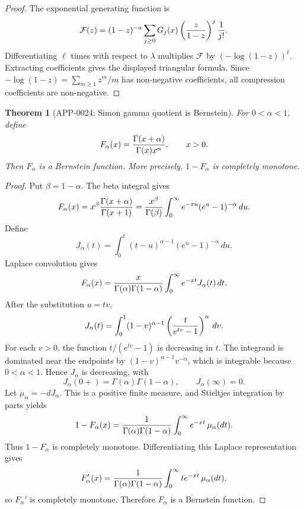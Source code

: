 \documentclass[11pt]{article}
\numberwithin{equation}{section}
\newtheorem{theorem}{Theorem}[section]
\theoremstyle{definition}
\theoremstyle{remark}
\newcommand{\1}{\mathbf 1}
\begin{document}
\begin{proof}
The exponential generating function is
\[
 \mathcal F(z)
 =(1-z)^{-a}\sum_{j\ge0}G_j(x)
      \left({z\over 1-z}\right)^j{1\over j!}.
\]
Differentiating \(\ell\) times with respect to \(\lambda\) multiplies
\(\mathcal F\) by \((-\log(1-z))^\ell\).  Extracting coefficients gives the
displayed triangular formula.  Since
\(-\log(1-z)=\sum_{m\ge1}z^m/m\) has non-negative coefficients, all compression
coefficients are non-negative.
\end{proof}

\begin{theorem}[APP-0024: Simon gamma quotient is Bernstein]
\label{thm:app24-simon-gamma-quotient}
For \(0<\alpha<1\), define
\[
  F_\alpha(x)={\Gamma(x+\alpha)\over \Gamma(x)x^\alpha},
  \qquad x>0 .
\]
Then \(F_\alpha\) is a Bernstein function.  More precisely,
\(1-F_\alpha\) is completely monotone.
\end{theorem}

\begin{proof}
Put \(\beta=1-\alpha\).  The beta integral gives
\[
 F_\alpha(x)
 =x^\beta{\Gamma(x+\alpha)\over\Gamma(x+1)}
 ={x^\beta\over\Gamma(\beta)}
   \int_0^\infty e^{-xu}(e^u-1)^{-\alpha}\,du .
\]
Define
\[
 J_\alpha(t)=\int_0^t (t-u)^{\alpha-1}(e^u-1)^{-\alpha}\,du .
\]
Laplace convolution gives
\[
 F_\alpha(x)
 ={x\over\Gamma(\alpha)\Gamma(1-\alpha)}
   \int_0^\infty e^{-xt}J_\alpha(t)\,dt .
\]
After the substitution \(u=tv\),
\[
J_\alpha(t)=
\int_0^1(1-v)^{\alpha-1}
\left({t\over e^{tv}-1}\right)^\alpha\,dv .
\]
For each \(v>0\), the function \(t/(e^{tv}-1)\) is decreasing in \(t\).
The integrand is dominated near the endpoints by
\((1-v)^{\alpha-1}v^{-\alpha}\), which is integrable because
\(0<\alpha<1\).  Hence \(J_\alpha\) is decreasing, with
\[
 J_\alpha(0+)=\Gamma(\alpha)\Gamma(1-\alpha),
 \qquad
 J_\alpha(\infty)=0 .
\]
Let \(\mu_\alpha=-dJ_\alpha\).  This is a positive finite measure, and
Stieltjes integration by parts yields
\[
 1-F_\alpha(x)
 ={1\over\Gamma(\alpha)\Gamma(1-\alpha)}
  \int_0^\infty e^{-xt}\,\mu_\alpha(dt).
\]
Thus \(1-F_\alpha\) is completely monotone.  Differentiating this Laplace
representation gives
\[
 F_\alpha'(x)
 ={1\over\Gamma(\alpha)\Gamma(1-\alpha)}
  \int_0^\infty t e^{-xt}\,\mu_\alpha(dt),
\]
so \(F_\alpha'\) is completely monotone.  Therefore \(F_\alpha\) is a
Bernstein function.
\end{proof}
\end{document}
